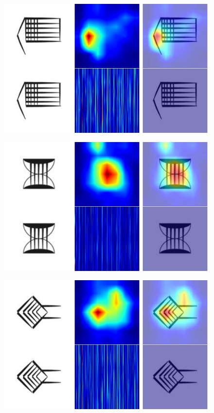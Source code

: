 \documentclass[11pt,a4paper,oneside]{report}
\begin{document}
 \begin{figure}[H]
    \centering
    \includegraphics[width=0.9\linewidth]{Visualizations/Grad-CAM/Proto-Cuneiform/gradcam__SZU2.E2~b__combined.pdf}
\end{figure}

 \begin{figure}[H]
    \centering
    \includegraphics[width=0.9\linewidth]{Visualizations/Grad-CAM/Proto-Cuneiform/gradcam_1(N52)_combined.pdf}
\end{figure}

 \begin{figure}[H]
    \centering
    \includegraphics[width=0.9\linewidth]{Visualizations/Grad-CAM/Proto-Cuneiform/gradcam_MUNSZUB~b_combined.pdf}
\end{figure}
\end{document}
